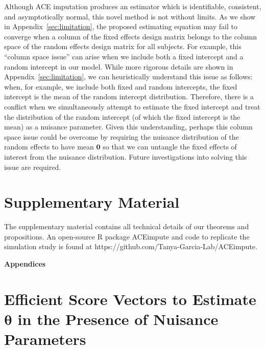 \documentclass[12pt]{article}
\def\boxit#1{\vbox{\hrule\hbox{\vrule\kern6pt
          \vbox{\kern6pt#1\kern6pt}\kern6pt\vrule}\hrule}}
\def\bzero{{\mathbf 0}}
\def\btheta{{\boldsymbol{\theta}}}
\def\bzero{{\boldsymbol{0}}}
\def\bb{{\boldsymbol b}}
\def\boxit#1{\vbox{\hrule\hbox{\vrule\kern6pt\vbox{\kern6pt#1\kern6pt}\kern6pt\vrule}\hrule}}
\def\tgcomment#1{\vskip 2mm\boxit{\vskip 2mm{\color{blue}\bf#1} {\color{blue}\bf -- TG\vskip 2mm}}\vskip 2mm}
\begin{document}
Although ACE imputation produces an estimator which is identifiable, consistent, and asymptotically normal, this novel method is not without limits. 
As we show in Appendix~\ref{sec:limitation}, the proposed estimating equation may fail to converge when a column of the fixed effects design matrix belongs to the column space of the random effects design matrix for all subjects. For example, this ``column space issue'' can arise when we include both a fixed intercept and a random intercept in our model. While more rigorous details are shown in Appendix~\ref{sec:limitation}, we can heuristically understand this issue as follows: when, for example, we include both fixed and random intercepts, the fixed intercept is the mean of the random intercept distribution. Therefore, there is a conflict when we simultaneously attempt to estimate the fixed intercept and treat the distribution of the random intercept (of which the fixed intercept is the mean) as a nuisance parameter. Given this understanding, perhaps this column space issue could be overcome by requiring the nuisance distribution of the random effects to have mean $\bzero$ so that we can untangle the fixed effects of interest from the nuisance distribution. Future investigations into solving this issue are required.

\section*{Supplementary Material} The supplementary material contains all technical details of our theorems and propositions. An open-source R package ACEimpute and code to replicate the simulation study is found at https://github.com/Tanya-Garcia-Lab/ACEimpute.





\appendix

\bigskip
\bigskip
\bigskip
\begin{center}
    {\LARGE\bf Appendices}
\end{center}
\medskip

\section{Efficient Score Vectors to Estimate $\btheta$ in the Presence of Nuisance Parameters}
\label{sec:original_score_vectors}

\end{document}
